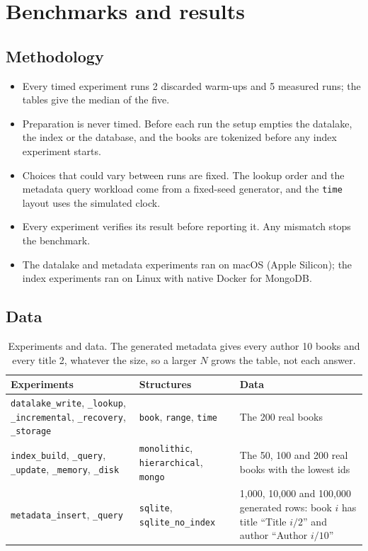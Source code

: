 \documentclass[11pt,a4paper]{article}
\newcommand{\code}[1]{\texttt{#1}}
\begin{document}
\section{Benchmarks and results}\label{sec:bench}

\subsection{Methodology}
\begin{itemize}
  \item Every timed experiment runs 2 discarded warm-ups and 5 measured runs; the tables give the
        median of the five.
  \item Preparation is never timed. Before each run the setup empties the datalake, the index or the
        database, and the books are tokenized before any index experiment starts.
  \item Choices that could vary between runs are fixed. The lookup order and the metadata query
        workload come from a fixed-seed generator, and the \code{time} layout uses the simulated
        clock.
  \item Every experiment verifies its result before reporting it. Any mismatch stops the benchmark.
  \item The datalake and metadata experiments ran on macOS (Apple Silicon); the index experiments
        ran on Linux with native Docker for MongoDB.
\end{itemize}

\subsection{Data}
\begin{table}[H]
\centering\small
\begin{tabularx}{\linewidth}{@{}L{4.3cm} L{3.3cm} Y@{}}
\toprule
Experiments & Structures & Data \\
\midrule
\code{datalake\_write}, \code{\_lookup}, \code{\_incremental}, \code{\_recovery}, \code{\_storage} & \code{book}, \code{range}, \code{time} & The 200 real books \\
\code{index\_build}, \code{\_query}, \code{\_update}, \code{\_memory}, \code{\_disk} & \code{monolithic}, \code{hierarchical}, \code{mongo} & The 50, 100 and 200 real books with the lowest ids \\
\code{metadata\_insert}, \code{\_query} & \code{sqlite}, \code{sqlite\_no\_index} & 1,000, 10,000 and 100,000 generated rows: book $i$ has title ``Title $i/2$'' and author ``Author $i/10$'' \\
\bottomrule
\end{tabularx}
\caption{Experiments and data. The generated metadata gives every author 10 books and every title 2, whatever the size, so a larger $N$ grows the table, not each answer.}
\end{table}
\end{document}
